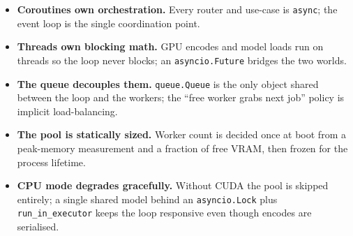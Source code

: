 \documentclass[11pt,a4paper]{article}
\begin{document}
\begin{itemize}[leftmargin=*]
  \item \textbf{Coroutines own orchestration.} Every router and use-case
        is \texttt{async}; the event loop is the single coordination
        point.
  \item \textbf{Threads own blocking math.} GPU encodes and model loads
        run on threads so the loop never blocks; an
        \texttt{asyncio.Future} bridges the two worlds.
  \item \textbf{The queue decouples them.} \texttt{queue.Queue} is the
        only object shared between the loop and the workers; the
        ``free worker grabs next job'' policy is implicit
        load-balancing.
  \item \textbf{The pool is statically sized.} Worker count is decided
        once at boot from a peak-memory measurement and a fraction of
        free VRAM, then frozen for the process lifetime.
  \item \textbf{CPU mode degrades gracefully.} Without CUDA the pool is
        skipped entirely; a single shared model behind an
        \texttt{asyncio.Lock} plus \texttt{run\_in\_executor} keeps the
        loop responsive even though encodes are serialised.
\end{itemize}
\end{document}
